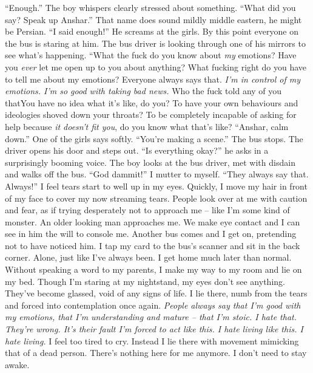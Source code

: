 \documentclass[a4paper, 12pt]{book}
\newcommand\tab[1][1cm]{\hspace*{#1}}
\begin{document}
\newline
\tab
``Enough.'' The boy whispers clearly stressed about something.
\newline
\tab
``What did you say? Speak up Anshar.'' That name does sound mildly middle eastern, he might be Persian.
\newline
\tab
``I said enough!'' He screams at the girls. By this point everyone on the bus is staring at him. The bus driver is looking through one of his mirrors to see what’s happening. ``What the fuck do you know about \textit{my} emotions? Have you \textit{ever} let me open up to you about anything? What fucking right do you have to tell me about my emotions? Everyone always says that. \textit{I’m in control of my emotions. I’m so good with taking bad news.} Who the fuck told any of you that\textinterrobang You have no idea what it’s like, do you? To have your own behaviours and ideologies shoved down your throats? To be completely incapable of asking for help because \textit{it doesn’t fit you}, do you know what that’s like?
\newline
\tab
``Anshar, calm down.'' One of the girls says softly. ``You’re making a scene.''
\newline
\tab
The bus stops. The driver opens his door and steps out. ``Is everything okay?'' he asks in a surprisingly booming voice. The boy looks at the bus driver, met with disdain and walks off the bus.
\newline
\newline
\tab
``God dammit!'' I mutter to myself. ``They always say that. Always!'' I feel tears start to well up in my eyes. Quickly, I move my hair in front of my face to cover my now streaming tears. People look over at me with caution and fear, as if trying desperately not to approach me -- like I’m some kind of monster.
An older looking man approaches me. We make eye contact and I can see in him the will to console me. Another bus comes and I get on, pretending not to have noticed him. I tap my card to the bus’s scanner and sit in the back corner. Alone, just like I’ve always been.
\newline
\tab
I get home much later than normal. Without speaking a word to my parents, I make my way to my room and lie on my bed. Though I’m staring at my nightstand, my eyes don’t see anything. They’ve become glassed, void of any signs of life. I lie there, numb from the tears and forced into contemplation once again.
\newline
\tab
\textit{People always say that I’m good with my emotions, that I’m understanding and mature -- that I’m stoic. I hate that. They’re wrong. It’s their fault I’m forced to act like this. I hate living like this. I hate living.} I feel too tired to cry. Instead I lie there with movement mimicking that of a dead person. There’s nothing here for me anymore. I don’t need to stay awake.
\end{document}
